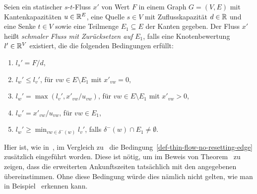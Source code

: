 \begin{definition}\label{def-thin-flow}
	Seien ein statischer $s$-$t$-Fluss $x'$ von Wert $F$ in einem Graph $G=(V,E)$ mit Kantenkapazitäten $u\in\mathbb{R}^E$, eine Quelle $s\in V$ mit Zuflusskapazität $d\in\mathbb{R}$ und eine Senke $t\in V$ sowie eine Teilmenge $E_1\subseteq E$ der Kanten gegeben.
	Der Fluss $x'$ heißt \emph{schmaler Fluss mit Zurücksetzen auf $E_1$}, falls eine Knotenbewertung $l'\in\mathbb{R}^V$ existiert, die die folgenden Bedingungen erfüllt:
	\begin{enumerate}[label=(T\arabic*)]
	\item $l_s' = F/d$,
	\item\label{def-thin-flow-x-zero} $l_w' \leq l_v'$, \tabto{4cm} für $vw\in E \setminus E_1$ mit $x'_{vw}=0$,
	\item\label{def-thin-flow-x-positive} $l_w' = \max(l_v', x'_{vw} / u_{vw} )$,  \tabto{4cm} für $vw\in E\setminus E_1$ mit $x'_{vw} > 0$,
	\item\label{def-thin-flow-resetting-edge} $l_w' = x'_{vw} / u_{vw}$,  \tabto{4cm} für $vw\in E_1$,
	
	\item\label{def-thin-flow-no-resetting-edge} $l_w' \geq \min_{vw\in \delta^-(w)} l_v'$, \tabto{4cm} falls $\delta^-(w)\cap E_1 \neq \emptyset$.
	\end{enumerate}
\end{definition}
\begin{remark}
	Hier ist, wie in~\cite[Definition 4]{Cominetti2011}, im Vergleich zu~\cite[Definition 6]{Koch2011} die Bedingung~\ref{def-thin-flow-no-resetting-edge} zusätzlich eingeführt worden.
	Diese ist nötig, um im Beweis von Theorem~ zu zeigen, dass die erweiterten Ankunftszeiten tatsächlich mit den angegebenen übereinstimmen.
	Ohne diese Bedingung würde dies nämlich nicht gelten, wie man in Beispiel~ erkennen kann.
\end{remark}

